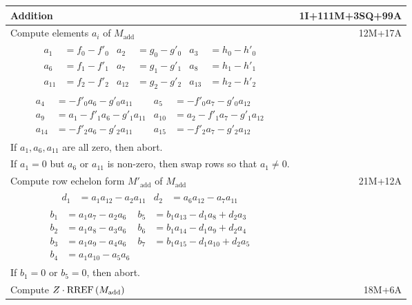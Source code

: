 \pagebreak
\setlength{\abovedisplayskip}{-10pt}
\setlength{\belowdisplayskip}{-10pt}
\begin{tabularx}{\linewidth}{|Xr|}
  \hline
  Addition & 1I+111M+3SQ+99A \\
  \hline
  Compute elements $a_i$ of $M_{\text{add}}$ & 12M+17A \\
  \hline
  {\begin{align*}
    a_1    &= f_0 - f'_0 & a_2    &= g_0 - g'_0 & a_3    &= h_0 - h'_0 \\
    a_6    &= f_1 - f'_1 & a_7    &= g_1 - g'_1 & a_8    &= h_1 - h'_1 \\
    a_{11} &= f_2 - f'_2 & a_{12} &= g_2 - g'_2 & a_{13} &= h_2 - h'_2
  \end{align*}} & \\
  {\begin{align*}
    a_4    &=     - f'_0a_6 - g'_0a_{11} & a_5    &=     - f'_0a_7 - g'_0a_{12} \\
    a_9    &= a_1 - f'_1a_6 - g'_1a_{11} & a_{10} &= a_2 - f'_1a_7 - g'_1a_{12} \\
    a_{14} &=     - f'_2a_6 - g'_2a_{11} & a_{15} &=     - f'_2a_7 - g'_2a_{12}
  \end{align*}} & \\
  If $a_1, a_6, a_{11}$ are all zero, then abort. & \\
  If $a_1 = 0$ but $a_6$ or $a_{11}$ is non-zero, then swap rows so that $a_1 \neq 0$. & \\
  \hline
  Compute row echelon form $M'_{\text{add}}$ of $M_{\text{add}}$ & 21M+12A \\
  \hline
  {\begin{align*}
    d_1 &= a_1a_{12} - a_2a_{11} & d_2 &= a_6a_{12} - a_7a_{11} 
  \end{align*}} & \\
  {\begin{align*}
    b_1 &= a_1a_7    - a_2a_6 & b_5 &= b_1a_{13} - d_1a_8    + d_2a_3 \\
    b_2 &= a_1a_8    - a_3a_6 & b_6 &= b_1a_{14} - d_1a_9    + d_2a_4 \\
    b_3 &= a_1a_9    - a_4a_6 & b_7 &= b_1a_{15} - d_1a_{10} + d_2a_5 \\
    b_4 &= a_1a_{10} - a_5a_6
  \end{align*}} & \\
  If $b_1 =0$ or $b_5 = 0$, then abort. & \\
  \hline
  Compute $Z \cdot \operatorname{RREF}\left(M_{\text{add}}\right)$ & 18M+6A \\

\end{tabularx}
